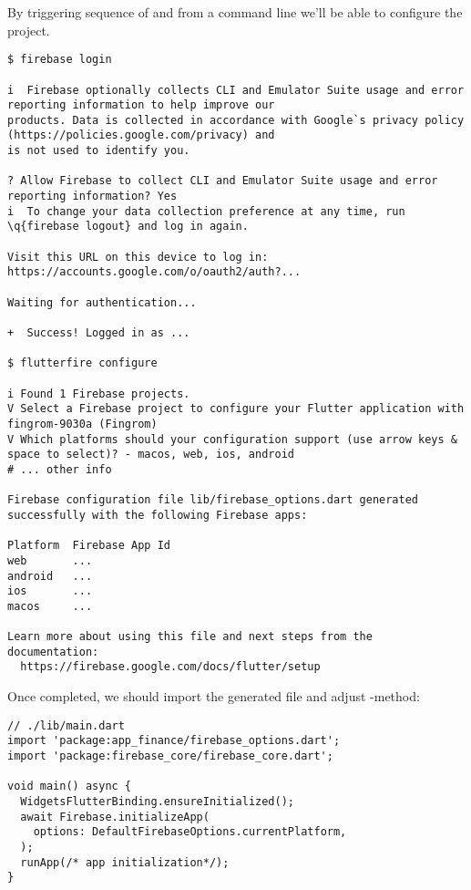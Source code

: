 \noindent By triggering sequence of  and  from a command line 
we'll be able to configure the project.

\begin{lstlisting}[language=terminal]
$ firebase login

i  Firebase optionally collects CLI and Emulator Suite usage and error reporting information to help improve our 
products. Data is collected in accordance with Google`s privacy policy (https://policies.google.com/privacy) and 
is not used to identify you.

? Allow Firebase to collect CLI and Emulator Suite usage and error reporting information? Yes
i  To change your data collection preference at any time, run \q{firebase logout} and log in again.

Visit this URL on this device to log in:
https://accounts.google.com/o/oauth2/auth?...

Waiting for authentication...

+  Success! Logged in as ...

$ flutterfire configure

i Found 1 Firebase projects.
V Select a Firebase project to configure your Flutter application with  fingrom-9030a (Fingrom)
V Which platforms should your configuration support (use arrow keys & space to select)? - macos, web, ios, android
# ... other info

Firebase configuration file lib/firebase_options.dart generated successfully with the following Firebase apps:

Platform  Firebase App Id
web       ...
android   ...
ios       ...
macos     ...

Learn more about using this file and next steps from the documentation:
  https://firebase.google.com/docs/flutter/setup
\end{lstlisting}

\noindent Once completed, we should import the generated file and adjust -method:

\begin{lstlisting}
// ./lib/main.dart
import 'package:app_finance/firebase_options.dart';
import 'package:firebase_core/firebase_core.dart';

void main() async {
  WidgetsFlutterBinding.ensureInitialized();
  await Firebase.initializeApp(
    options: DefaultFirebaseOptions.currentPlatform,
  );
  runApp(/* app initialization*/);
}
\end{lstlisting}

